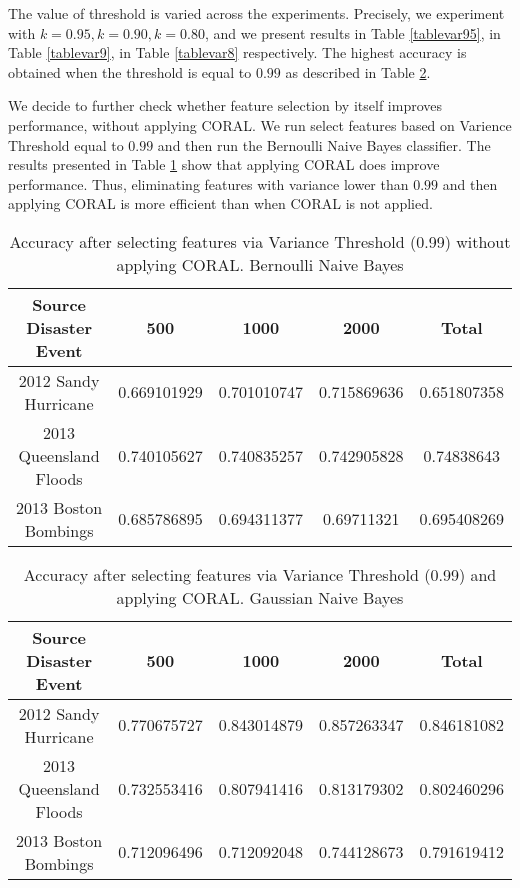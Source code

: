 The value of threshold is varied across the experiments. Precisely, we experiment with $k=0.95, k=0.90, k=0.80$, and we present results in Table \ref{tablevar95}, in Table \ref{tablevar9}, in Table \ref{tablevar8} respectively. The highest accuracy is obtained when the threshold is equal to $0.99$ as described in Table \ref{tablevar99}. 

We decide to further check whether feature selection by itself improves performance, without applying CORAL. We run select features based on Varience Threshold equal to $0.99$ and then run the Bernoulli Naive Bayes classifier. The results presented in Table \ref{tablevar99nocoral} show that applying CORAL does improve performance. Thus, eliminating features with variance lower than $0.99$ and then applying CORAL is more efficient than when CORAL is not applied. 

\begin{table}[ht]
    \begin{center}
    \caption{Accuracy after selecting features via Variance Threshold (0.99) without applying CORAL. Bernoulli Naive Bayes}
    \begin{tabular}[c]{|c|c|c|c|c|}
        \hline
        Source Disaster Event & 500 & 1000 & 2000 & Total \\
        \hline
        2012 Sandy Hurricane & 0.669101929 & 0.701010747 & 0.715869636 & 0.651807358 \\
        2013 Queensland Floods & 0.740105627 & 0.740835257 & 0.742905828 & 0.74838643 \\
        2013 Boston Bombings & 0.685786895 & 0.694311377 & 0.69711321 & 0.695408269 \\
        \hline
    \end{tabular}
    \label{tablevar99nocoral}
   \end{center}
\end{table}


\begin{table}[ht]
    \begin{center}
    \caption{Accuracy after selecting features via Variance Threshold (0.99) and applying CORAL. Gaussian Naive Bayes}
    \begin{tabular}[c]{|c|c|c|c|c|}
        \hline
        Source Disaster Event & 500 & 1000 & 2000 & Total \\
        \hline
        2012 Sandy Hurricane & 0.770675727 & 0.843014879 & 0.857263347 & 0.846181082 \\
        2013 Queensland Floods & 0.732553416 & 0.807941416 & 0.813179302 & 0.802460296 \\
        2013 Boston Bombings & 0.712096496 & 0.712092048 & 0.744128673 & 0.791619412 \\
        \hline
    \end{tabular}
    \label{tablevar99}
   \end{center}
\end{table}



